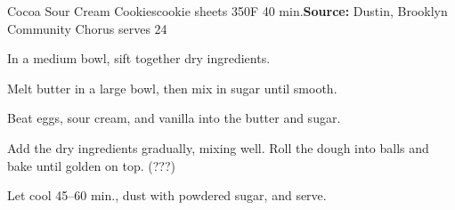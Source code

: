 \begin{recipe}{Cocoa Sour Cream Cookies}{cookie sheets \hfill 350\0F \hfill 40 min.}{\textbf{Source:} Dustin, Brooklyn Community Chorus \hfill serves 24}

 In a medium bowl, sift together dry ingredients.

 Melt butter in a large bowl, then mix in sugar until smooth.

 Beat eggs, sour cream, and vanilla into the butter and sugar.

 \newstep Add the dry ingredients gradually, mixing well. Roll the dough into balls and bake until golden on top. (???)

 Let cool 45--60 min., dust with powdered sugar, and serve.

\end{recipe}
